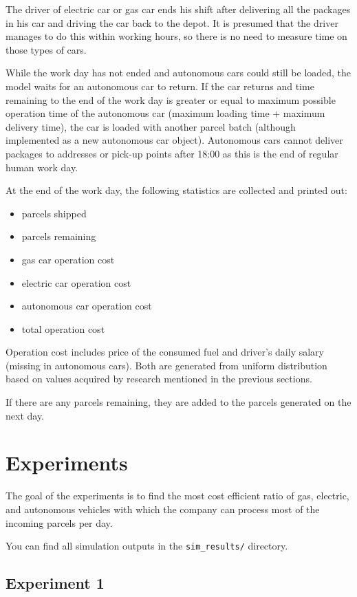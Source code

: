 \documentclass[a4paper, 11pt, a4paper]{article}
\begin{document}
The driver of electric car or gas car ends his shift after delivering all the
packages in his car and driving the car back to the depot. It is presumed that
the driver manages to do this within working hours, so there is no need to
measure time on those types of cars.

While the work day has not ended and autonomous cars could still be loaded, the
model waits for an autonomous car to return. If the car returns and time
remaining to the end of the work day is greater or equal to maximum possible
operation time of the autonomous car (maximum loading time + maximum delivery
time), the car is loaded with another parcel batch (although implemented
as a new autonomous car object). Autonomous cars cannot deliver packages to
addresses or pick-up points after 18:00 as this is the end of regular human work
day. \newline

\noindent At the end of the work day, the following statistics are collected and printed
out:
\begin{itemize}
    \item parcels shipped
    \item parcels remaining
    \item gas car operation cost
    \item electric car operation cost
    \item autonomous car operation cost
    \item total operation cost
\end{itemize}
Operation cost includes price of the consumed fuel and driver's daily salary
(missing in autonomous cars). Both are generated from uniform distribution based
on values acquired by research mentioned in the previous sections.

If there are any parcels remaining, they are added to the parcels generated on
the next day.

\section{Experiments}

The goal of the experiments is to find the most cost efficient ratio of gas,
electric, and autonomous vehicles with which the company can process most of the
incoming parcels per day.

You can find all simulation outputs in the \texttt{sim\_results/} directory.

\subsection{Experiment 1}
\end{document}
